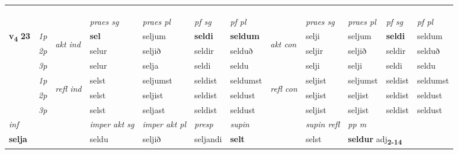 \begin{longtable}[l]{X>{\footnotesize\itshape}llXXXXlXXXX}
\midrule
 & \\*
   & \\*
  & \\
   \midrule
 & &   & \textit{praes sg}  & \textit{praes pl}    & \textit{ pf sg} & \textit{pf pl} & & \textit{praes sg}  & \textit{praes pl}    & \textit{pf sg} & \textit{pf pl }  \\ \cmidrule{4-7} \cmidrule{9-12}
 \multirow{2}{*}{{{\textbf{v{\textsubscript{4}}} \Large{\textbf{23}}}}}  & 1p & \multirow{3}{*}{\begin{turn}{90}\textit{akt ind}\end{turn}} & \textbf{sel} & seljum & \textbf{seldi} & \textbf{seldum} & \multirow{3}{*}{\begin{turn}{90}\textit{akt con}\end{turn}} &selji & seljum & \textbf{seldi} & seldum\\*
 & 2p &  &  selur  & seljið & seldir & selduð & & seljir & seljið & seldir & selduð \\*
 & 3p &  & selur & selja & seldi & seldu & & selji & selji& seldi & seldu \\*
\cmidrule{4-7} \cmidrule{9-12}
 & 1p & \multirow{3}{*}{\begin{turn}{90}\textit{refl ind}\end{turn}}  & selst & seljumst & seldist & seldumst & \multirow{3}{*}{\begin{turn}{90}\textit{refl con}\end{turn}}  &seljist & seljumst & seldist & seldumst \\*
 & 2p &  & selst & seljist & seldist & seldust & &seljist & seljist & seldist & seldust \\*
 & 3p  & & selst & seljast & seldist & seldust & & seljist & seljist& seldist & seldust \\*
\cmidrule{4-7} \cmidrule{9-12}

   {\textit{inf}} & &  & \textit{imper akt sg} & \textit{imper akt pl}   & \textit{presp} & \textit{supin} && \textit{supin refl} & \textit{pp m} \\*
  {\textbf{selja}} & && seldu  & seljið   & seljandi &  \textbf{selt} && selst & \multicolumn{2}{l}{\textbf{seldur} adj\textbf{\textsubscript{2-14}}} \\*

\midrule


\end{longtable}
